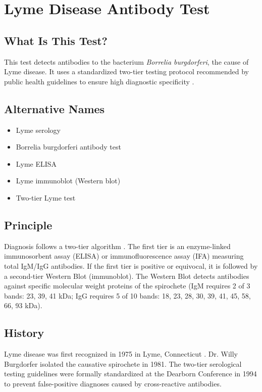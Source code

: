 \chapter{Lyme Disease Antibody Test}

\section*{What Is This Test?}
This test detects antibodies to the bacterium \textit{Borrelia burgdorferi}, the cause of Lyme disease. It uses a standardized two-tier testing protocol recommended by public health guidelines to ensure high diagnostic specificity \cite{cdc2023lyme}.

\section*{Alternative Names}
\begin{itemize}
  \item Lyme serology
  \item Borrelia burgdorferi antibody test
  \item Lyme ELISA
  \item Lyme immunoblot (Western blot)
  \item Two-tier Lyme test
\end{itemize}

\section*{Principle}
Diagnosis follows a two-tier algorithm \cite{lantos2021clinical}. The first tier is an enzyme-linked immunosorbent assay (ELISA) or immunofluorescence assay (IFA) measuring total IgM/IgG antibodies. If the first tier is positive or equivocal, it is followed by a second-tier Western Blot (immunoblot). The Western Blot detects antibodies against specific molecular weight proteins of the spirochete (IgM requires 2 of 3 bands: 23, 39, 41 kDa; IgG requires 5 of 10 bands: 18, 23, 28, 30, 39, 41, 45, 58, 66, 93 kDa).

\section*{History}
Lyme disease was first recognized in 1975 in Lyme, Connecticut \cite{steere2016lyme}. Dr. Willy Burgdorfer isolated the causative spirochete in 1981. The two-tier serological testing guidelines were formally standardized at the Dearborn Conference in 1994 to prevent false-positive diagnoses caused by cross-reactive antibodies.

